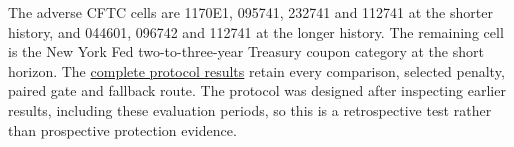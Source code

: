The adverse CFTC cells are 1170E1, 095741, 232741 and 112741 at the shorter history, and 044601, 096742 and 112741 at the longer history. The remaining cell is the New York Fed two-to-three-year Treasury coupon category at the short horizon. The \href{https://github.com/ByronLi0207/financial-mathematics-paper-20261020/tree/revision-v13/results/v13/recommended-protocol}{complete protocol results} retain every comparison, selected penalty, paired gate and fallback route. The protocol was designed after inspecting earlier results, including these evaluation periods, so this is a retrospective test rather than prospective protection evidence.
